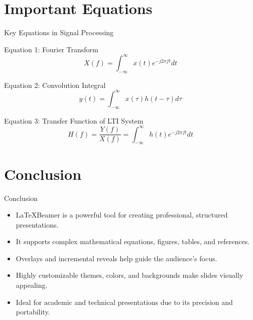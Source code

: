 \documentclass[pdf]{beamer}
\begin{document}
	\section{Important Equations}
	\begin{frame}{Key Equations in Signal Processing}
		\begin{block}{Equation 1: Fourier Transform}
			\begin{equation*}
				\label{eq:1}
				X(f)=\int_{-\infty}^{\infty} x(t)e^{-j2\pi ft} dt
			\end{equation*}
		\end{block}
	\begin{block}{Equation 2: Convolution Integral}
		\begin{equation*}
			\label{eq:2}
			y(t)=\int_{-\infty}^{\infty} x(\tau)h(t-\tau)d\tau
		\end{equation*}
	\end{block}
	\begin{block}{Equation 3: Transfer Function of LTI System}
		\begin{equation*}
			\label{eq:3}
			H(f)=\frac{Y(f)}{X(f)} = \int_{-\infty}^{\infty} h(t)e^{-j2\pi ft}dt
		\end{equation*}
	\end{block}
	\end{frame}
	\section{Conclusion}
	\begin{frame}{Conclusion}
		\begin{itemize}
			\item \LaTeX Beamer is a powerful tool for creating professional, structured
			presentations.\pause
			\item It supports complex mathematical equations, figures, tables, and
			references.\pause
			\item Overlays and incremental reveals help guide the audience’s focus.\pause
			\item Highly customizable themes, colors, and backgrounds make slides
			visually appealing.\pause
			\item Ideal for academic and technical presentations due to its precision and
			portability.
		\end{itemize}
	\end{frame}
\end{document}
